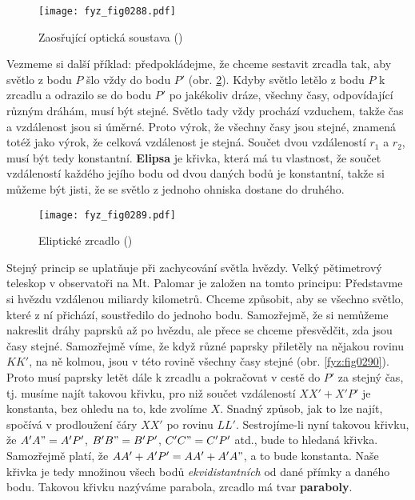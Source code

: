     \begin{figure}[ht!] %
      \centering
      \texttt{[image: fyz\_fig0288.pdf]}
      \caption{Zaosřující optická soustava
               (\cite[s.~351]{Feynman01})}
      \label{fyz:fig0288}
    \end{figure}

    Vezmeme si další příklad: předpokládejme, že chceme sestavit zrcadla tak, aby světlo z bodu 
    \(P\) šlo vždy do bodu \(P'\) (obr. \ref{fyz:fig0289}). Kdyby světlo letělo z bodu \(P\) k 
    zrcadlu a odrazilo se do bodu \(P'\) po jakékoliv dráze, všechny časy, odpovídající různým 
    dráhám, musí být stejné. Světlo tady vždy prochází vzduchem, takže čas a vzdálenost jsou si 
    úměrné. Proto výrok, že všechny časy jsou stejné, znamená totéž jako výrok, že celková 
    vzdálenost je stejná. Součet dvou vzdáleností \(r_1\) a \(r_2\), musí být tedy konstantní. 
    \textbf{Elipsa} je křivka, která má tu vlastnost, že součet vzdáleností každého jejího bodu od 
    dvou daných bodů je konstantní, takže si můžeme být jisti, že se světlo z jednoho ohniska 
    dostane do druhého.
    
    \begin{figure}[ht!] %
      \centering
      \texttt{[image: fyz\_fig0289.pdf]}
      \caption{Eliptické zrcadlo
               (\cite[s.~351]{Feynman01})}
      \label{fyz:fig0289}
    \end{figure}

    Stejný princip se uplatňuje při zachycování světla hvězdy. Velký pětimetrový teleskop v 
    observatoři na Mt. Palomar je založen na tomto principu: Představme si hvězdu vzdálenou 
    miliardy kilometrů. Chceme způsobit, aby se všechno světlo, které z ní přichází, soustředilo do 
    jednoho bodu. Samozřejmě, že si nemůžeme nakreslit dráhy paprsků až po hvězdu, ale přece se 
    chceme přesvědčit, zda jsou časy stejné. Samozřejmě víme, že když různé paprsky přiletěly na 
    nějakou rovinu \(KK'\), na ně kolmou, jsou v této rovině všechny časy stejné (obr. 
    \ref{fyz:fig0290}). Proto musí paprsky letět dále k zrcadlu a pokračovat v cestě do \(P'\) za 
    stejný čas, tj. musíme najít takovou křivku, pro niž součet vzdáleností \(XX' + X'P'\) je 
    konstanta, bez ohledu na to, kde zvolíme \(X\). Snadný způsob, jak to lze najít, spočívá v 
    prodloužení čáry \(XX'\) po rovinu \(LL'\). Sestrojíme-li nyní takovou křivku, že \(A'A" = 
    A'P'\), \(B'B" = B'P'\), \(C'C" = C'P'\) atd., bude to hledaná křivka. Samozřejmě platí, že 
    \(AA' + A'P' = AA' + A'A"\), a to bude konstanta. Naše křivka je tedy množinou všech bodů 
    \emph{ekvidistantních} od dané přímky a daného bodu. Takovou křivku nazýváme parabola, zrcadlo 
    má tvar \textbf{paraboly}.

